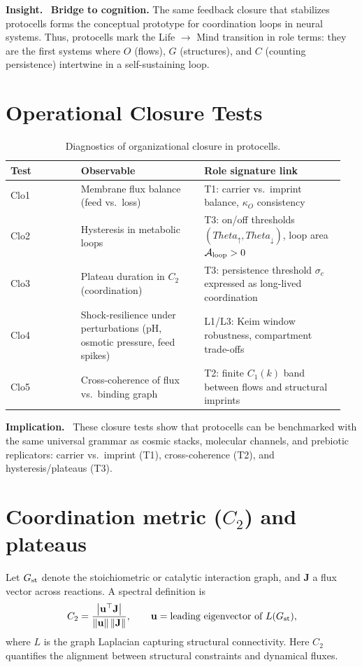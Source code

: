 \documentclass[12pt,a4paper,oneside]{scrreprt}
\def\Theta{Theta}%
\newenvironment{insight}{\par\vspace{0.5em}\noindent\textbf{Insight.}\ }{\par\vspace{0.5em}}
\newenvironment{implication}{\par\vspace{0.5em}\noindent\textbf{Implication.}\ }{\par\vspace{0.5em}}
\begin{document}
\begin{insight}
\textbf{Bridge to cognition.} 
The same feedback closure that stabilizes protocells 
forms the conceptual prototype for coordination loops in neural systems. 
Thus, protocells mark the Life $\to$ Mind transition in role terms: 
they are the first systems where $O$ (flows), $G$ (structures), 
and $C$ (counting persistence) intertwine in a self-sustaining loop. 
\end{insight}

\section*{Operational Closure Tests}

\begin{table}[h!]
\centering
\caption{Diagnostics of organizational closure in protocells.}
\begin{tabular}{p{0.2\linewidth} p{0.35\linewidth} p{0.4\linewidth}}
\toprule
\textbf{Test} & \textbf{Observable} & \textbf{Role signature link} \\
\midrule
Clo1 & Membrane flux balance (feed vs.\ loss) & T1: carrier vs.\ imprint balance, $\kappa_O$ consistency \\
Clo2 & Hysteresis in metabolic loops & T3: on/off thresholds $(\Theta_\uparrow,\Theta_\downarrow)$, loop area $\mathcal A_{\rm loop}>0$ \\
Clo3 & Plateau duration in $C_2$ (coordination) & T3: persistence threshold $\sigma_c$ expressed as long-lived coordination \\
Clo4 & Shock-resilience under perturbations (pH, osmotic pressure, feed spikes) & L1/L3: Keim window robustness, compartment trade-offs \\
Clo5 & Cross-coherence of flux vs.\ binding graph & T2: finite $C_1(k)$ band between flows and structural imprints \\
\bottomrule
\end{tabular}
\end{table}

\begin{implication}
These closure tests show that protocells can be benchmarked 
with the same universal grammar as cosmic stacks, 
molecular channels, and prebiotic replicators: 
carrier vs.\ imprint (T1), cross-coherence (T2), 
and hysteresis/plateaus (T3). 
\end{implication}

\section{Coordination metric ($C_2$) and plateaus}\label{sec:life-C2}
Let $G_{\rm st}$ denote the stoichiometric or catalytic interaction graph, and $\mathbf J$ a flux vector across reactions. 
A spectral definition is
\begin{equation}
C_2=\frac{\left|\mathbf u^\top \mathbf J\right|}{\|\mathbf u\|\,\|\mathbf J\|},\qquad 
\mathbf u=\text{leading eigenvector of }L(G_{\rm st}),
\end{equation}
where $L$ is the graph Laplacian capturing structural connectivity. 
Here $C_2$ quantifies the alignment between structural constraints and dynamical fluxes. 
\end{document}

